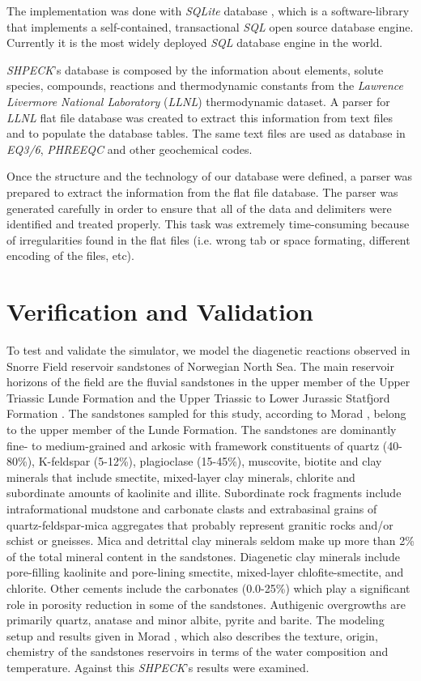 \documentclass[preprint,12pt,3p]{elsarticle}
\begin{document}
The implementation was done with \emph{SQLite} database \cite{SQLite}, which is a software-library that implements a self-contained, transactional \emph{SQL} open source database engine. Currently it is the most widely deployed \emph{SQL} database engine in the world.

\emph{SHPECK}'s database is composed by the information about elements, solute species, compounds, reactions and thermodynamic constants from the \emph{Lawrence Livermore National Laboratory} (\emph{LLNL}) thermodynamic dataset. A parser for \emph{LLNL} flat file database was created to extract this information from text files and to populate the database tables. The same text files are used as database in \emph{EQ3/6}, \emph{PHREEQC} and other geochemical codes.

Once the structure and the technology of our database were defined, a parser was prepared to extract the information from the flat file database. 
The parser was generated carefully in order to ensure that all of the data and delimiters were identified and treated properly. This task was extremely time-consuming because of irregularities found in the flat files (i.e. wrong tab or space formating, different encoding of the files, etc).

\section{Verification and Validation}
To test and validate the simulator, we model the diagenetic reactions observed in Snorre Field reservoir sandstones of Norwegian North Sea. The main reservoir horizons of the field are the fluvial sandstones in the upper member of the Upper Triassic Lunde Formation and the Upper Triassic to Lower Jurassic Statfjord Formation \cite{Hollander:87}. The sandstones sampled for this study, according to Morad \cite{Morad:90}, belong to the upper member of the Lunde Formation. The sandstones are dominantly fine- to medium-grained and arkosic with framework constituents of quartz (40-80\%), K-feldspar (5-12\%), plagioclase (15-45\%), muscovite, biotite and clay minerals that include smectite, mixed-layer clay minerals, chlorite and subordinate amounts of kaolinite and illite. Subordinate rock fragments include intraformational mudstone and carbonate clasts and extrabasinal grains of quartz-feldspar-mica aggregates that probably represent granitic rocks and/or schist or gneisses. Mica and detrittal clay minerals seldom make up more than 2\% of the total mineral content in the sandstones. Diagenetic clay minerals include pore-filling kaolinite and pore-lining smectite, mixed-layer chlofite-smectite, and chlorite. Other cements include the carbonates (0.0-25\%) which play a significant role in porosity reduction in some of the sandstones. Authigenic overgrowths are primarily quartz, anatase and minor albite, pyrite and barite.
The modeling setup and results given in Morad \cite{Morad:90}, which also describes the texture, origin, chemistry of the sandstones reservoirs in terms of the water composition and temperature. Against this \emph{SHPECK}’s results were examined.
\end{document}
